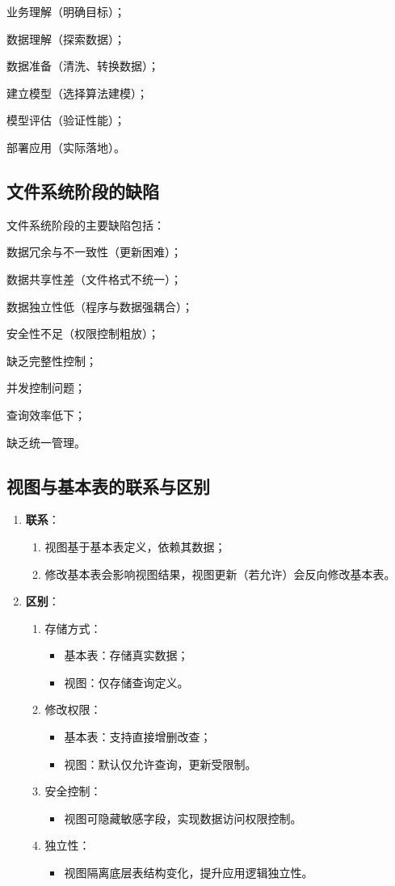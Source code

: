 \documentclass[a4paper,12pt,UTF8,fontset=none]{ctexart}
\begin{document}
业务理解（明确目标）；

数据理解（探索数据）；

数据准备（清洗、转换数据）；

建立模型（选择算法建模）；

模型评估（验证性能）；

部署应用（实际落地）。
\subsection{文件系统阶段的缺陷}
文件系统阶段的主要缺陷包括：

数据冗余与不一致性（更新困难）；

数据共享性差（文件格式不统一）；

数据独立性低（程序与数据强耦合）；

安全性不足（权限控制粗放）；

缺乏完整性控制；

并发控制问题；

查询效率低下；

缺乏统一管理。
\subsection{视图与基本表的联系与区别}
\begin{enumerate}
    \item \textbf{联系}：
    \begin{enumerate}
        \item 视图基于基本表定义，依赖其数据；
        \item 修改基本表会影响视图结果，视图更新（若允许）会反向修改基本表。
    \end{enumerate}
    
    \item \textbf{区别}：
    \begin{enumerate}
        \item 存储方式：
            \begin{itemize}
                \item 基本表：存储真实数据；
                \item 视图：仅存储查询定义。
            \end{itemize}
        \item 修改权限：
            \begin{itemize}
                \item 基本表：支持直接增删改查；
                \item 视图：默认仅允许查询，更新受限制。
            \end{itemize}
        \item 安全控制：
            \begin{itemize}
                \item 视图可隐藏敏感字段，实现数据访问权限控制。
            \end{itemize}
        \item 独立性：
            \begin{itemize}
                \item 视图隔离底层表结构变化，提升应用逻辑独立性。
            \end{itemize}
    \end{enumerate}
\end{enumerate}
\end{document}
